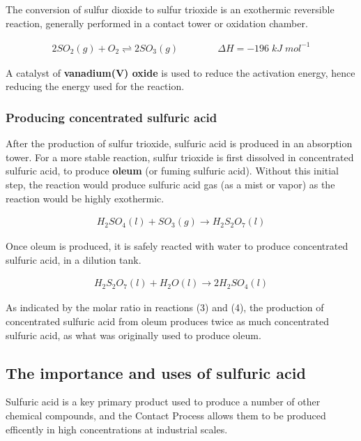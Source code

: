 \documentclass[12pt, a4paper]{article}
\begin{document}
The conversion of sulfur dioxide to sulfur trioxide is an exothermic reversible reaction, generally performed in a contact tower or oxidation chamber.

\begin{align}
	2SO_{2}(g) + O_{2} \rightleftharpoons 2SO_{3}(g) \qquad \qquad \Delta H = -196 \; kJ \; mol^{-1}
\end{align}

A catalyst of \textbf{vanadium(V) oxide} is used to reduce the activation energy, hence reducing the energy used for the reaction.

\pagebreak






\subsubsection{Producing concentrated sulfuric acid}

After the production of sulfur trioxide, sulfuric acid is produced in an absorption tower. For a more stable reaction, sulfur trioxide is first dissolved in concentrated sulfuric acid, to produce \textbf{oleum} (or fuming sulfuric acid). Without this initial step, the reaction would produce sulfuric acid gas (as a mist or vapor) as the reaction would be highly exothermic.

\begin{align}
	H_{2}SO_{4}(l) + SO_{3}(g) \rightarrow H_{2}S_{2}O_{7}(l)
\end{align}

Once oleum is produced, it is safely reacted with water to produce concentrated sulfuric acid, in a dilution tank.

\begin{align}
	H_{2}S_{2}O_{7}(l) + H_{2}O(l) \rightarrow 2H_{2}SO_{4}(l)
\end{align}

As indicated by the molar ratio in reactions (3) and (4), the production of concentrated sulfuric acid from oleum produces twice as much concentrated sulfuric acid, as what was originally used to produce oleum.






\subsection{The importance and uses of sulfuric acid}

Sulfuric acid is a key primary product used to produce a number of other chemical compounds, and the Contact Process allows them to be produced efficently in high concentrations at industrial scales. 
\end{document}
